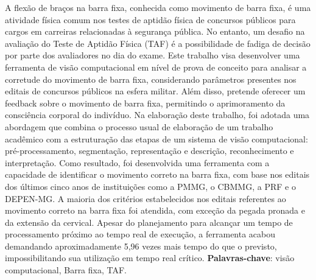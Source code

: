 \documentclass[
	12pt,			%
	openany,		%
	oneside,		%
	a4paper,		%
	english,		%
	brazil			%
	]{abntex2}
\begin{document}
\begin{resumo}
	A flexão de braços na barra fixa, conhecida como movimento de barra fixa, é uma atividade física comum nos testes de aptidão física de concursos públicos para cargos em carreiras relacionadas à segurança pública. No entanto, um desafio na avaliação do Teste de Aptidão Física (\acs{TAF}) é a possibilidade de fadiga de decisão por parte dos avaliadores no dia do exame.
	Este trabalho visa desenvolver uma ferramenta de visão computacional em nível de prova de conceito para analisar a corretude do movimento de barra fixa, considerando parâmetros presentes nos editais de concursos públicos na esfera militar. Além disso, pretende oferecer um feedback sobre o movimento de barra fixa, permitindo o aprimoramento da consciência corporal do indivíduo.
	Na elaboração deste trabalho, foi adotada uma abordagem que combina o processo usual de elaboração de um trabalho acadêmico com a estruturação das etapas de um sistema de visão computacional: pré-processamento, segmentação, representação e descrição, reconhecimento e interpretação.
	Como resultado, foi desenvolvida uma ferramenta com a capacidade de identificar o movimento correto na barra fixa, com base nos editais dos últimos cinco anos de instituições como a \ac{PMMG}, o \ac{CBMMG}, a \ac{PRF} e o \ac{DEPEN-MG}. A maioria dos critérios estabelecidos nos editais referentes ao movimento correto na barra fixa foi atendida, com exceção da pegada pronada e da extensão da cervical. Apesar do planejamento para alcançar um tempo de processamento próximo ao tempo real de execução, a ferramenta acabou demandando aproximadamente 5,96 vezes mais tempo do que o previsto, impossibilitando sua utilização em tempo real crítico. 
 \textbf{Palavras-chave}: visão computacional, Barra fixa, TAF.
\end{resumo}
\end{document}

